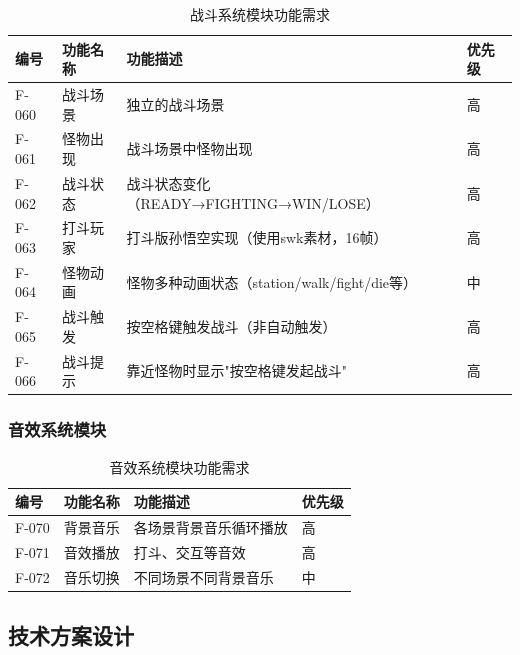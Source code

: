 \documentclass[12pt,a4paper]{article}
\begin{document}
\begin{table}[H]
\centering
\caption{战斗系统模块功能需求}
\renewcommand{\arraystretch}{1.3}
\begin{tabularx}{\textwidth}{>{\centering\arraybackslash}m{2cm}>{\centering\arraybackslash}m{3cm}>{\centering\arraybackslash}m{5cm}>{\centering\arraybackslash}m{2cm}}
\toprule
\textbf{编号} & \textbf{功能名称} & \textbf{功能描述} & \textbf{优先级} \\
\midrule
F-060 & 战斗场景 & 独立的战斗场景 & 高 \\
F-061 & 怪物出现 & 战斗场景中怪物出现 & 高 \\
F-062 & 战斗状态 & 战斗状态变化（READY→FIGHTING→WIN/LOSE） & 高 \\
F-063 & 打斗玩家 & 打斗版孙悟空实现（使用swk素材，16帧） & 高 \\
F-064 & 怪物动画 & 怪物多种动画状态（station/walk/fight/die等） & 中 \\
F-065 & 战斗触发 & 按空格键触发战斗（非自动触发） & 高 \\
F-066 & 战斗提示 & 靠近怪物时显示"按空格键发起战斗" & 高 \\
\bottomrule
\end{tabularx}
\end{table}

\subsubsection{音效系统模块}

\begin{table}[H]
\centering
\caption{音效系统模块功能需求}
\renewcommand{\arraystretch}{1.3}
\begin{tabularx}{\textwidth}{>{\centering\arraybackslash}m{2cm}>{\centering\arraybackslash}m{3cm}>{\centering\arraybackslash}m{5cm}>{\centering\arraybackslash}m{2cm}}
\toprule
\textbf{编号} & \textbf{功能名称} & \textbf{功能描述} & \textbf{优先级} \\
\midrule
F-070 & 背景音乐 & 各场景背景音乐循环播放 & 高 \\
F-071 & 音效播放 & 打斗、交互等音效 & 高 \\
F-072 & 音乐切换 & 不同场景不同背景音乐 & 中 \\
\bottomrule
\end{tabularx}
\end{table}

\subsection{技术方案设计}
\end{document}
